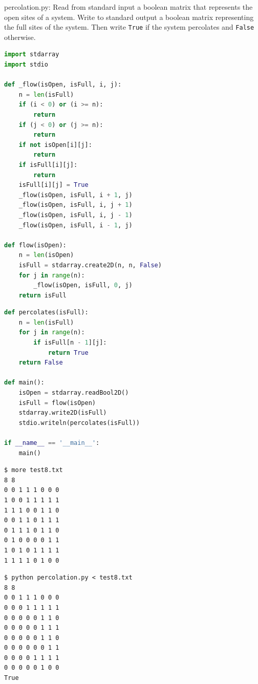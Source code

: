\documentclass[8pt,a4paper,compress]{beamer}
\begin{document}
\begin{frame}[fragile]
\pause

\begin{framed}
\tiny percolation.py: Read from standard input a boolean matrix that represents the open sites of a system. Write to standard output a boolean matrix representing the full sites of the system. Then write \lstinline{True} if the system percolates and \lstinline{False} otherwise.

\end{framed}

\begin{lstlisting}[language=Python]
import stdarray
import stdio

def _flow(isOpen, isFull, i, j):
    n = len(isFull)
    if (i < 0) or (i >= n):
        return
    if (j < 0) or (j >= n):
        return
    if not isOpen[i][j]:
        return
    if isFull[i][j]:
        return
    isFull[i][j] = True
    _flow(isOpen, isFull, i + 1, j)
    _flow(isOpen, isFull, i, j + 1)
    _flow(isOpen, isFull, i, j - 1)
    _flow(isOpen, isFull, i - 1, j)

def flow(isOpen):
    n = len(isOpen)
    isFull = stdarray.create2D(n, n, False)
    for j in range(n):
        _flow(isOpen, isFull, 0, j)
    return isFull
\end{lstlisting}
\end{frame}

\begin{frame}[fragile]
\pause

\begin{lstlisting}[language=Python]
def percolates(isFull):
    n = len(isFull)
    for j in range(n):
        if isFull[n - 1][j]:
            return True
    return False

def main():
    isOpen = stdarray.readBool2D()
    isFull = flow(isOpen)
    stdarray.write2D(isFull)
    stdio.writeln(percolates(isFull))

if __name__ == '__main__':
    main()
\end{lstlisting}
\end{frame}

\begin{frame}[fragile]
\pause

\begin{lstlisting}[language={}]
$ more test8.txt 
8 8
0 0 1 1 1 0 0 0
1 0 0 1 1 1 1 1
1 1 1 0 0 1 1 0
0 0 1 1 0 1 1 1
0 1 1 1 0 1 1 0
0 1 0 0 0 0 1 1
1 0 1 0 1 1 1 1
1 1 1 1 0 1 0 0
\end{lstlisting}

\pause

\begin{lstlisting}[language={}]
$ python percolation.py < test8.txt 
8 8
0 0 1 1 1 0 0 0 
0 0 0 1 1 1 1 1 
0 0 0 0 0 1 1 0 
0 0 0 0 0 1 1 1 
0 0 0 0 0 1 1 0 
0 0 0 0 0 0 1 1 
0 0 0 0 1 1 1 1 
0 0 0 0 0 1 0 0 
True
\end{lstlisting}
\end{frame}
\end{document}
